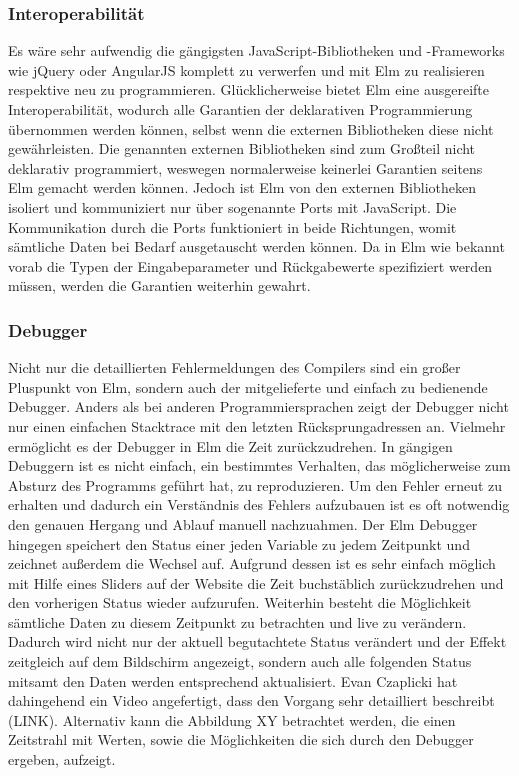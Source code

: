 \subsubsection{Interoperabilität}
\label{sec:Interoperabilität}
Es wäre sehr aufwendig die gängigsten JavaScript-Bibliotheken und -Frameworks wie jQuery oder AngularJS komplett zu verwerfen und mit Elm zu realisieren respektive neu zu programmieren. Glücklicherweise bietet Elm eine ausgereifte Interoperabilität, wodurch alle Garantien der deklarativen Programmierung übernommen werden können, selbst wenn die externen Bibliotheken diese nicht gewährleisten.
Die genannten externen Bibliotheken sind zum Großteil nicht deklarativ programmiert, weswegen normalerweise keinerlei Garantien seitens Elm gemacht werden können. Jedoch ist Elm von den externen Bibliotheken isoliert und kommuniziert nur über sogenannte Ports mit JavaScript. Die Kommunikation durch die Ports funktioniert in beide Richtungen, womit sämtliche Daten bei Bedarf ausgetauscht werden können. Da in Elm wie bekannt vorab die Typen der Eingabeparameter und Rückgabewerte spezifiziert werden müssen, werden die Garantien weiterhin gewahrt.

\subsubsection{Debugger}
\label{sec:Debugger}
Nicht nur die detaillierten Fehlermeldungen des Compilers sind ein großer Pluspunkt von Elm, sondern auch der mitgelieferte und einfach zu bedienende Debugger. Anders als bei anderen Programmiersprachen zeigt der Debugger nicht nur einen einfachen Stacktrace mit den letzten Rücksprungadressen an. Vielmehr ermöglicht es der Debugger in Elm die Zeit zurückzudrehen. In gängigen Debuggern ist es nicht einfach, ein bestimmtes Verhalten, das möglicherweise zum Absturz des Programms geführt hat, zu reproduzieren. Um den Fehler erneut zu erhalten und dadurch ein Verständnis des Fehlers aufzubauen ist es oft notwendig den genauen Hergang und Ablauf manuell nachzuahmen. Der Elm Debugger hingegen speichert den Status einer jeden Variable zu jedem Zeitpunkt und zeichnet außerdem die Wechsel auf. Aufgrund dessen ist es sehr einfach möglich mit Hilfe eines Sliders auf der Website die Zeit buchstäblich zurückzudrehen und den vorherigen Status wieder aufzurufen. Weiterhin besteht die Möglichkeit sämtliche Daten zu diesem Zeitpunkt zu betrachten und live zu verändern. Dadurch wird nicht nur der aktuell begutachtete Status verändert und der Effekt zeitgleich auf dem Bildschirm angezeigt, sondern auch alle folgenden Status mitsamt den Daten werden entsprechend aktualisiert. Evan Czaplicki hat dahingehend ein Video angefertigt, dass den Vorgang sehr detailliert beschreibt (LINK). Alternativ kann die Abbildung XY betrachtet werden, die einen Zeitstrahl mit Werten, sowie die Möglichkeiten die sich durch den Debugger ergeben, aufzeigt.


